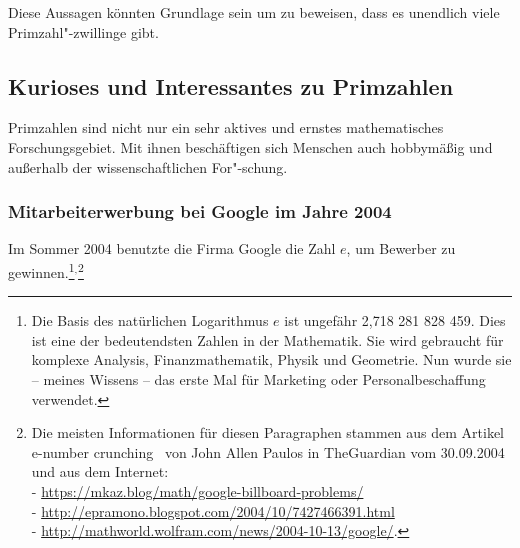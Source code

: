 \begin{refsegment}
Diese Aussagen könnten Grundlage sein um zu beweisen, dass es unendlich
viele Primzahl"-zwillinge gibt.



\subsection[Kurioses und Interessantes zu Primzahlen]
              {Kurioses und Interessantes zu Primzahlen\footnotemark}
\label{HT-Quaint-curious-Primes-usage}

Primzahlen sind nicht nur ein sehr aktives und ernstes mathematisches
Forschungsgebiet. Mit ihnen beschäftigen sich Menschen auch hobbymäßig und
außerhalb der wissenschaftlichen For"-schung.


\hypertarget{HT-GoogleRecruitment2004}{}
\subsubsection{Mitarbeiterwerbung bei Google im Jahre 2004}
%
\label{HT-GoogleRecruitment2004}%
\mbox{}
Im Sommer 2004 benutzte die Firma Google die Zahl $e$, um Bewerber zu
gewinnen.\footnote{Die Basis des natürlichen Logarithmus
$e$ ist ungefähr 2,718 281 828 459.
Dies ist eine der bedeutendsten Zahlen in der Mathematik. Sie wird gebraucht
für komplexe Analysis, Finanzmathematik, Physik und Geometrie. Nun wurde sie
-- meines Wissens -- das erste Mal für Marketing oder Personalbeschaffung
verwendet.}${}^,$\footnote{Die meisten Informationen für diesen Paragraphen
stammen aus dem Artikel \glqq e-number crunching\grqq~ von John Allen Paulos
in TheGuardian vom 30.09.2004 und aus dem Internet:\\
- \url{https://mkaz.blog/math/google-billboard-problems/}\\
- \url{http://epramono.blogspot.com/2004/10/7427466391.html}\\
- \url{http://mathworld.wolfram.com/news/2004-10-13/google/}.
}


\end{refsegment}
